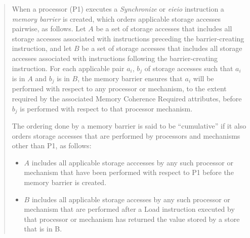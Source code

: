 \documentclass[10pt]{article}
\begin{document}
\begin{quotation}
When a processor (P1) executes a {\em Synchronize} or {\em eieio} instruction a
{\em memory barrier} is created, which orders applicable storage
accesses pairwise, as follows. Let $A$ be a set of storage accesses that
includes all storage accesses associated with instructions preceding
the barrier-creating instruction, and let $B$ be a set of storage
accesses that includes all storage accesses associated with
instructions following the barrier-creating instruction. For each
applicable pair $a_i$, $b_j$ of storage accesses such that $a_i$ is in $A$ and 
$b_j$ is in $B$, the memory barrier ensures that $a_i$ will be performed with
respect to any processor or mechanism, to the extent required by the
associated Memory Coherence Required attributes, before $b_j$ is
performed with respect to that processor mechanism.

The ordering done by a memory barrier is said to be ``cumulative'' if
it also orders storage accesses that are performed by processors and
mechanisms other than P1, as follows:
\begin{itemize}
  \item $A$ includes all applicable storage acccesses by any such
  processor or mechanism that have been performed with respect to P1
  before the memory barrier is created.

  \item $B$ includes all applicable storage accesses by any such
  processor or mechanism that are performed after a Load instruction
  executed by that processor or mechanism has returned the value
  stored by a store that is in B.
\end{itemize}

\end{quotation}
\end{document}
